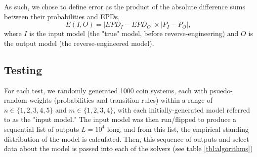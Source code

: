 \documentclass{article}
\begin{document}
As such, we chose to define error as the product of the absolute difference sums between their probabilities and EPDs,
\begin{equation}
    E(I,O) = |EPD_{I} - EPD_{O}| \times |P_{I} - P_{O}|,
\end{equation}
where $I$ is the input model (the "true" model, before reverse-engineering) and $O$ is the output model (the reverse-engineered model).

\subsection{Testing}

For each test, we randomly generated 1000 coin systems, each with psuedo-random weights (probabilities and transition rules) within a range of $n \in \{1, 2, 3, 4, 5\}$ and $m \in \{1, 2, 3, 4\}$, with each initially-generated model referred to as the "input model." The input model was then run/flipped to produce a sequential list of outputs $L=10^4$ long, and from this list, the empirical standing distribution of the model is calculated. Then, this sequence of outputs and select data about the model is passed into each of the solvers (see table \ref{tbl:algorithms})
\end{document}
